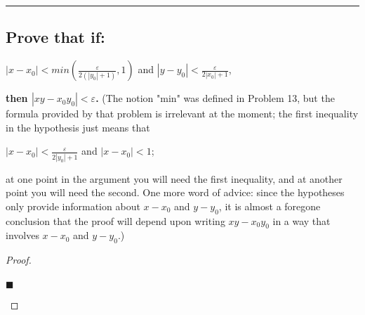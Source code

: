 \documentclass[letterpaper, 10 pt, conference]{ieeeconf}  %
\begin{document}
\noindent\rule{8cm}{0.4pt}
\begin{mdframed}
\subsection{\textbf{Prove that if:}}
\begin{center}
    $\left\lvert x - x_0 \right\rvert < min(\frac{\varepsilon}{2(\left\lvert y_0 \right\rvert + 1)}, 1)$ and $\left\lvert y - y_0 \right\rvert < \frac{\varepsilon}{2\left\lvert x_0 \right\rvert + 1}$,
\end{center}
\textbf{then $\left\lvert xy - x_0y_0 \right\rvert < \varepsilon$.}
\newline
(The notion "min" was defined in Problem 13, but the formula provided by that problem is irrelevant at the moment; the first inequality in the hypothesis just means that
\begin{center}
    $\left\lvert x - x_0 \right\rvert < \frac{\varepsilon}{2\left\lvert y_0 \right\rvert + 1}$ and $\left\lvert x - x_0 \right\rvert < 1$;
\end{center}
at one point in the argument you will need the first inequality, and at another point you will need the second. One more word of advice: since the hypotheses only provide information about $x - x_0$ and $y - y_0$, it is almost a foregone conclusion that the proof will depend upon writing $xy - x_0y_0$ in a way that involves $x - x_0$ and $y - y_0$.)
\end{mdframed}
\begin{proof}
\begin{align}
    
\end{align}
\begin{flushright}
$\blacksquare$
\end{flushright}
\end{proof}
\end{document}
